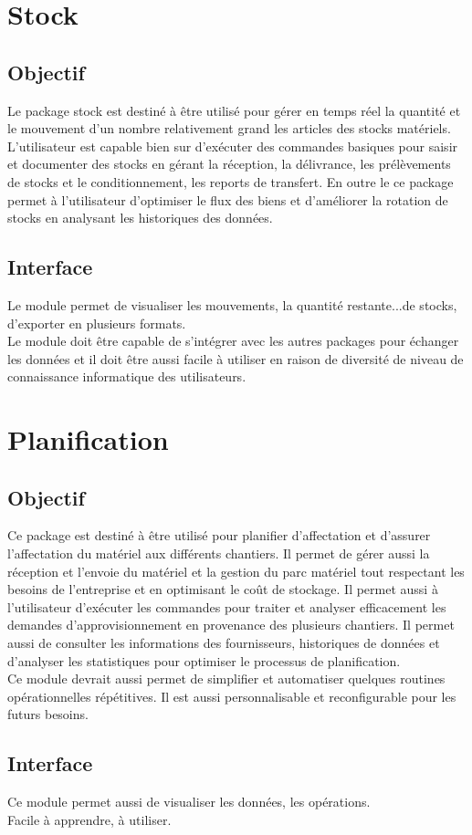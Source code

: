 \section{Stock}
\subsection{Objectif}
Le package stock est destiné à être utilisé pour gérer en temps réel la quantité et le mouvement d'un nombre relativement grand les articles des stocks matériels. L'utilisateur est capable bien sur d'exécuter des commandes basiques pour saisir et documenter des stocks en gérant la réception, la délivrance, les prélèvements de stocks et le conditionnement, les reports de transfert. En outre le ce package permet à l'utilisateur d'optimiser le flux des biens et d'améliorer la rotation de stocks en analysant les historiques des données.\\  

\subsection{Interface}
Le module permet de visualiser les mouvements, la quantité restante...de stocks, d'exporter en plusieurs formats.\\
Le module doit être capable de s'intégrer avec les autres packages pour échanger les données et il doit être aussi facile à utiliser en raison de diversité de niveau de connaissance informatique des utilisateurs.

\section{Planification}
\subsection{Objectif}
Ce package est destiné à être utilisé pour planifier d'affectation et d'assurer l'affectation du matériel aux différents chantiers. Il permet de gérer aussi la réception et l'envoie du matériel et la gestion du parc matériel tout respectant les besoins de l'entreprise et en optimisant le coût de stockage. Il permet aussi  à l'utilisateur d'exécuter les commandes pour traiter et analyser efficacement les demandes d'approvisionnement en provenance des plusieurs chantiers. Il permet aussi de consulter les informations des fournisseurs, historiques de données et d'analyser les statistiques pour optimiser le processus de planification.\\ 
Ce module devrait aussi permet de simplifier et automatiser quelques routines opérationnelles répétitives. Il est aussi personnalisable et reconfigurable pour les futurs besoins. \\
\subsection{Interface}
Ce module permet aussi de visualiser les données, les opérations.\\ 
Facile à apprendre, à utiliser. 
